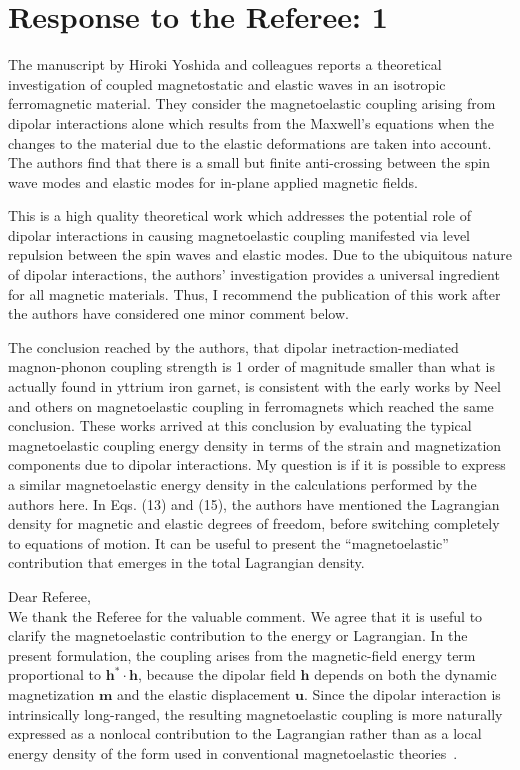 \documentclass[11pt]{revtex4-2}
\newenvironment{refereecomment}{\par\begingroup\color{blue}\noindent}{\par\endgroup}
\newcommand{\ResponseHeader}{\par\vspace{0.6em}\noindent\textbf{Response:}\par\noindent}
\begin{document}
\section*{Response to the Referee: 1}
\begin{refereecomment}
    The manuscript by Hiroki Yoshida and colleagues reports a theoretical investigation of coupled magnetostatic and elastic waves in an isotropic ferromagnetic material. They consider the magnetoelastic coupling arising from dipolar interactions alone which results from the Maxwell’s equations when the changes to the material due to the elastic deformations are taken into account. The authors find that there is a small but finite anti-crossing between the spin wave modes and elastic modes for in-plane applied magnetic fields.

    This is a high quality theoretical work which addresses the potential role of dipolar interactions in causing magnetoelastic coupling manifested via level repulsion between the spin waves and elastic modes. Due to the ubiquitous nature of dipolar interactions, the authors’ investigation provides a universal ingredient for all magnetic materials. Thus, I recommend the publication of this work after the authors have considered one minor comment below.

    The conclusion reached by the authors, that dipolar inetraction-mediated magnon-phonon coupling strength is 1 order of magnitude smaller than what is actually found in yttrium iron garnet, is consistent with the early works by Neel and others on magnetoelastic coupling in ferromagnets which reached the same conclusion. These works arrived at this conclusion by evaluating the typical magnetoelastic coupling energy density in terms of the strain and magnetization components due to dipolar interactions. My question is if it is possible to express a similar magnetoelastic energy density in the calculations performed by the authors here. In Eqs. (13) and (15), the authors have mentioned the Lagrangian density for magnetic and elastic degrees of freedom, before switching completely to equations of motion. It can be useful to present the “magnetoelastic” contribution that emerges in the total Lagrangian density.\\
\end{refereecomment}

Dear Referee,\\

We thank the Referee for the valuable comment. We agree that it is useful to clarify the magnetoelastic contribution to the energy or Lagrangian. In the present formulation, the coupling arises from the magnetic-field energy term proportional to $\bm{h}^*\cdot\bm{h}$, because the dipolar field $\bm{h}$ depends on both the dynamic magnetization $\bm{m}$ and the elastic displacement $\bm{u}$. Since the dipolar interaction is intrinsically long-ranged, the resulting magnetoelastic coupling is more naturally expressed as a nonlocal contribution to the Lagrangian rather than as a local energy density of the form used in conventional magnetoelastic theories~\cite{Kittel1949,KittelAbrahams1953,Neel1954,CallenCallen1963}.
\end{document}
